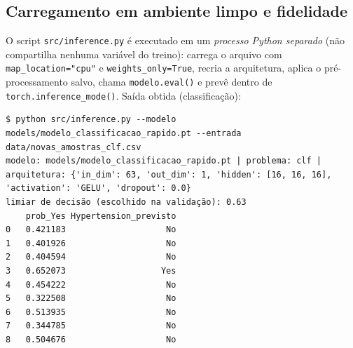 \documentclass[11pt,a4paper]{article}
\begin{document}
\subsection{Carregamento em ambiente limpo e fidelidade}
O script \texttt{src/inference.py} é executado em um \emph{processo Python separado} (não compartilha nenhuma variável do treino):
carrega o arquivo com \texttt{map\_location="cpu"} e \texttt{weights\_only=True}, recria a arquitetura, aplica o pré-processamento
salvo, chama \texttt{modelo.eval()} e prevê dentro de \texttt{torch.inference\_mode()}. Saída obtida (classificação):
\begin{verbatim}
$ python src/inference.py --modelo models/modelo_classificacao_rapido.pt --entrada data/novas_amostras_clf.csv
modelo: models/modelo_classificacao_rapido.pt | problema: clf | arquitetura: {'in_dim': 63, 'out_dim': 1, 'hidden': [16, 16, 16], 'activation': 'GELU', 'dropout': 0.0}
limiar de decisão (escolhido na validação): 0.63
    prob_Yes Hypertension_previsto
0   0.421183                    No
1   0.401926                    No
2   0.404594                    No
3   0.652073                   Yes
4   0.454222                    No
5   0.322508                    No
6   0.513935                    No
7   0.344785                    No
8   0.504676                    No
\end{verbatim}
\begin{table}[H]\centering\scriptsize{}
\caption{Verificação de fidelidade no teste: saídas do modelo em memória $\times$ modelo carregado do .pt (métrica principal).}\label{tab:fid}\end{table}
\end{document}
